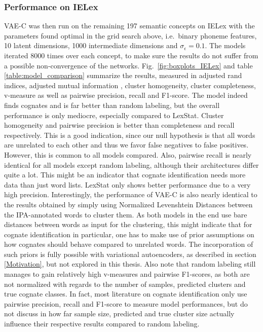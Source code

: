 \documentclass[6pt]{article}
\begin{document}
\subsubsection{Performance on IELex}

VAE-C was then run on the remaining 197 semantic concepts on IELex with the parameters found optimal in the grid search above, i.e.\ binary phoneme features, 10 latent dimensions, 1000 intermediate dimensions and $\sigma_{\epsilon}= 0.1$. The models iterated 8000 times over each concept, to make sure the results do not suffer from a possible non-convergence of the networks.   Fig.\ \ref{fig:boxplots_IELex} and table \ref{table:model_comparison} summarize the results, measured in adjusted rand indices, adjusted mutual information \citep{vinh2010information}, cluster homogeneity, cluster completeness, v-measure \citep{rosenberg2007v} as well as pairwise precision, recall and F1-score.
The model indeed finds cognates and is far better than random labeling, but the overall performance is only mediocre, especially compared to LexStat. Cluster homogeneity and pairwise precision is better than completeness and recall respectively. This is a good indication, since our null hypothesis is that all words are unrelated to each other and thus we favor false negatives to false positives.  However, this is common to all models compared. Also, pairwise recall is nearly identical for all models except random labeling, although their architectures differ quite a lot. This might be an indicator that cognate identification needs more data than just word lists. LexStat only shows better performance due to a very high precision.  
Interestingly, the performance of VAE-C is also nearly identical to the results obtained by simply using Normalized Levenshtein Distances between the IPA-annotated words to cluster them. As both models in the end use bare distances between words as input for the clustering, this might indicate that for cognate identification in particular, one has to make use of prior assumptions on how cognates should behave compared to unrelated words. The incorporation of such priors is fully possible with variational autoencoders, as described in section \ref{Motivation}, but not explored in this thesis. 
Also note that random labeling still manages to gain relatively high v-measures and pairwise F1-scores, as both are not normalized with regards to the number of samples, predicted clusters and true cognate classes. In fact, most literature on cognate identification \citep{mackay2005computing,list2012lexstat,wahle2013alignment,rama2016siamese} only use pairwise precision, recall and F1-score to measure model performances, but do not discuss in how far sample size, predicted and true cluster size actually influence their respective results compared to random labeling. 
\end{document}
